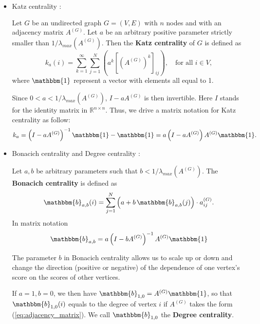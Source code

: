 \begin{itemize}
	\item Katz centrality \cite{katz1953new}: 
	
	\begin{definition} Let $G$ be an undirected graph $G=(V,E)$ with $n$ nodes and with an adjacency matrix $A^{(G)}$. Let $a$ be an arbitrary positive parameter strictly smaller than $1/ \lambda_{max}(A^{(G)})$. Then the \textbf{Katz centrality} of $G$ is defined as
		\begin{equation}
		k_a(i) = \sum_{k=1}^{\infty} \sum_{j=1}^N \left( a^k \left[\left(A^{(G)}\right)^k \right]_{ij}  \right), \quad \text{for all } i \in V,
		\end{equation}
		where $\mathbbm{1}$ represent a vector with elements all equal to 1.
	\end{definition}
	
	Since $0 < a < 1/\lambda_{max}(A^{(G)})$, $I - a A^{(G)}$ is then invertible. Here $I$ stands for the identity matrix in $\mathbb{R}^{n\times n}$. Thus, we drive a matrix notation for Katz centrality as follow:
	$$
	k_a = \left( I - a A^{(G)} \right)^{-1} \mathbbm{1} - \mathbbm{1} = a \left( I - a A^{(G)} \right) A^{(G)} \mathbbm{1}.
	$$
	
	\item Bonacich centrality and Degree centrality \cite{bonacich1987power}:
	
	\begin{definition}
		Let $a,b$ be arbitrary parameters such that $b < 1/ \lambda_{max}(A^{(G)})$. The \textbf{Bonacich centrality} is defined as
		\begin{equation}
		\mathbbm{b}_{a,b}(i) = \sum_{j=1}^N \left( a+ b\, \mathbbm{b}_{a,b}(j) \right)\cdot a_{ij}^{(G)}.
		\end{equation}
		In matrix notation
		\begin{equation}
		\mathbbm{b}_{a,b} = a \left( I - b A^{(G)} \right)^{-1} A^{(G)} \mathbbm{1}
		\end{equation}
	\end{definition}
	
	The parameter $b$ in Bonacich centrality allows us to scale up or down and change the direction (positive or negative) of the dependence of one vertex's score on the scores of other vertices.
	
	If $a=1, b=0$, we then have $\mathbbm{b}_{1,0} = A^{(G)} \mathbbm{1}$, so that $\mathbbm{b}_{1,0}(i)$ equals to the degree of vertex $i$ if $A^{(G)}$ takes the form (\ref{eq:adjacency_matrix}). We call $\mathbbm{b}_{1,0}$ the \textbf{Degree centrality}.
	

\end{itemize}
